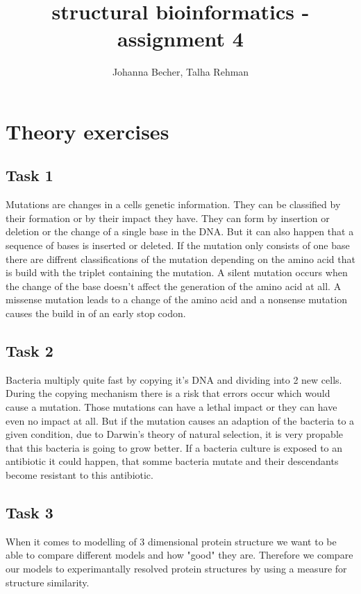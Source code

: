 \documentclass[]{article}
\title{structural bioinformatics - assignment 4}
\author{Johanna Becher, Talha Rehman}
\date{}
\begin{document}
\maketitle

\section{Theory exercises}
\subsection{Task 1}
Mutations are changes in a cells genetic information. They can be classified by their formation or by their impact they have. \newline
They can form by insertion or deletion or the change of a single base in the DNA. But it can also happen that a sequence of bases is inserted or deleted.\newline
If the mutation only consists of one base there are diffrent classifications of the mutation depending on the amino acid that is build with the triplet containing the mutation.\newline
A silent mutation occurs when the change of the base doesn't affect the generation of the amino acid at all. A missense mutation leads to a change of the amino acid and a nonsense mutation causes the build in of an early stop codon. \newline

\subsection{Task 2}
Bacteria multiply quite fast by copying it's DNA and dividing into 2 new cells. During the copying mechanism there is a risk that errors occur which would cause a mutation. \newline
Those mutations can have a lethal impact or they can have even no impact at all. But if the mutation causes an adaption of the bacteria to a given condition, due to Darwin's theory of natural selection, it is very propable that this bacteria is going to grow better.\newline
If a bacteria culture is exposed to an antibiotic it could happen, that somme bacteria mutate and their descendants become resistant to this antibiotic.

\subsection{Task 3}
When it comes to modelling of 3 dimensional protein structure we want to be able to compare different models and how "good" they are. Therefore we compare our models to experimantally resolved  protein structures by using a measure for structure similarity.\newpage 
\end{document}

